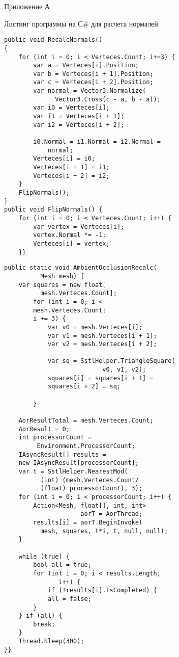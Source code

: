 \clearpage
{}
\begin{flushright}\Large{Приложение А}\end{flushright}
\begin{center}\large{Листинг программы на С\# для расчета нормалей}\end{center}
\begin{lstlisting}
public void RecalcNormals()
{
    for (int i = 0; i < Verteces.Count; i+=3) {
        var a = Verteces[i].Position;
        var b = Verteces[i + 1].Position;
        var c = Verteces[i + 2].Position;
        var normal = Vector3.Normalize(
              Vector3.Cross(c - a, b - a));
        var i0 = Verteces[i];
        var i1 = Verteces[i + 1];
        var i2 = Verteces[i + 2];

        i0.Normal = i1.Normal = i2.Normal = 
            normal;
        Verteces[i] = i0;
        Verteces[i + 1] = i1;
        Verteces[i + 2] = i2;
    }
    FlipNormals();
}
public void FlipNormals() {
    for (int i = 0; i < Verteces.Count; i++) {
        var vertex = Verteces[i];
        vertex.Normal *= -1;
        Verteces[i] = vertex;
    }}
\end{lstlisting}

\clearpage
\begin{lstlisting}
public static void AmbientOcclusionRecalc(
          Mesh mesh) {
    var squares = new float[
          mesh.Verteces.Count];
        for (int i = 0; i < 
        mesh.Verteces.Count; 
        i += 3) {
            var v0 = mesh.Verteces[i];
            var v1 = mesh.Verteces[i + 1];
            var v2 = mesh.Verteces[i + 2];

            var sq = SstlHelper.TriangleSquare(
                           v0, v1, v2);
            squares[i] = squares[i + 1] = 
            squares[i + 2] = sq;

        }

    AorResultTotal = mesh.Verteces.Count;
    AorResult = 0;
    int processorCount = 
         Environment.ProcessorCount;
    IAsyncResult[] results = 
    new IAsyncResult[processorCount];
    var t = SstlHelper.NearestMod(
          (int) (mesh.Verteces.Count/
          (float) processorCount), 3);
    for (int i = 0; i < processorCount; i++) {
        Action<Mesh, float[], int, int> 
                     aorT = AorThread;
        results[i] = aorT.BeginInvoke(
          mesh, squares, t*i, t, null, null);
    }

    while (true) {
        bool all = true;
        for (int i = 0; i < results.Length; 
               i++) {
            if (!results[i].IsCompleted) {
            all = false;
        }
    } if (all) {
        break;
    }
    Thread.Sleep(300);
}}
\end{lstlisting}

